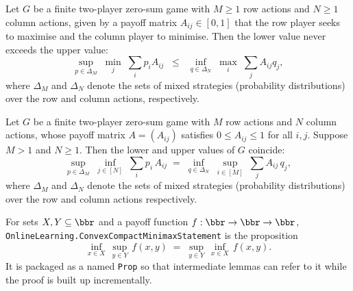 \begin{lemma}
\label{OnlineLearning.finiteLowerValue_le_upperValue}
\leanok
{}
Let $G$ be a finite two-player zero-sum game with $M \geq 1$ row actions and $N \geq 1$
column actions, given by a payoff matrix $A_{ij} \in [0,1]$ that the row player seeks to
maximise and the column player to minimise. Then the lower value never exceeds the upper
value:
\[
  \sup_{p \in \Delta_M}\; \min_{j}\; \sum_{i} p_i A_{ij}
  \;\;\leq\;\;
  \inf_{q \in \Delta_N}\; \max_{i}\; \sum_{j} A_{ij} q_j,
\]
where $\Delta_M$ and $\Delta_N$ denote the sets of mixed strategies (probability
distributions) over the row and column actions, respectively.
\end{lemma}

\begin{theorem}
\label{OnlineLearning.finite_minimax_value}
\leanok
{}
Let $G$ be a finite two-player zero-sum game with $M$ row actions and $N$ column
actions, whose payoff matrix $A = (A_{ij})$ satisfies $0 \le A_{ij} \le 1$ for all
$i,j$. Suppose $M > 1$ and $N \ge 1$. Then the lower and upper values of $G$ coincide:
\[
  \sup_{p \in \Delta_M}\; \inf_{j \in [N]}\; \sum_{i} p_i\, A_{ij}
  \;=\;
  \inf_{q \in \Delta_N}\; \sup_{i \in [M]}\; \sum_{j} A_{ij}\, q_j,
\]
where $\Delta_M$ and $\Delta_N$ denote the sets of mixed strategies (probability
distributions) over the row and column actions respectively.
\end{theorem}

\begin{definition}
\label{OnlineLearning.ConvexCompactMinimaxStatement}
\leanok
For sets $X, Y \subseteq \bbr$ and a payoff function $f : \bbr \to \bbr \to \bbr$,
\texttt{OnlineLearning.ConvexCompactMinimaxStatement} is the proposition
\[
  \inf_{x \in X}\,\sup_{y \in Y}\,f(x,y)
  \;=\;
  \sup_{y \in Y}\,\inf_{x \in X}\,f(x,y).
\]
It is packaged as a named \texttt{Prop} so that intermediate lemmas can refer
to it while the proof is built up incrementally.
\end{definition}

